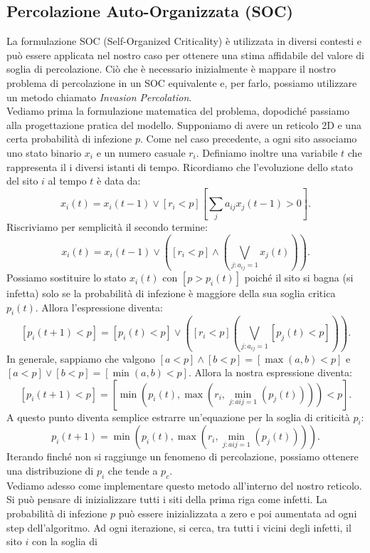 \documentclass{article}
\begin{document}
    \subsection{Percolazione Auto-Organizzata (SOC)}
    La formulazione SOC (Self-Organized Criticality) è utilizzata in diversi contesti e può essere applicata nel nostro
    caso per ottenere una stima affidabile del valore di soglia di percolazione. Ciò che è necessario inizialmente è
    mappare il nostro problema di percolazione in un SOC equivalente e, per farlo, possiamo utilizzare un metodo chiamato
    \textit{Invasion Percolation}.\\
    Vediamo prima la formulazione matematica del problema, dopodiché passiamo alla progettazione pratica del modello.
    Supponiamo di avere un reticolo 2D e una certa probabilità di infezione $p$. Come nel caso precedente, a ogni sito
    associamo uno stato binario $x_i$ e un numero casuale $r_i$. Definiamo inoltre una variabile $t$ che rappresenta il
    i diversi istanti di tempo. Ricordiamo che l'evoluzione dello stato del sito $i$ al tempo $t$ è data da:
    \[x_i(t)=x_i(t-1)\lor[r_i < p]\left[\sum_{j} a_{ij}x_j(t-1)>0 \right].\]
    Riscriviamo per semplicità il secondo termine:
    \[x_i(t)=x_i(t-1)\lor\left([r_i < p]\land \left(\bigvee\limits_{j:a_{ij}=1} x_j(t)\right)\right).\]
    Possiamo sostituire lo stato $x_i(t)$ con $[p>p_i(t)]$ poiché il sito si bagna (si infetta) solo se la probabilità
    di infezione è maggiore della sua soglia critica $p_i(t)$. Allora l'espressione diventa:
    \[[p_i(t+1) < p]=[p_i(t)<p] \lor \left( [r_i<p]\left( \bigvee\limits_{j:a_{ij}=1}[p_j(t)<p] \right) \right).\]
    In generale, sappiamo che valgono $[a<p]\land[b<p]=[\max(a,b)<p]$ e $[a<p]\lor[b<p]=[\min(a,b)<p]$. Allora la nostra
    espressione diventa:
    \[[p_i(t+1)<p]=\left[\min\left( p_i(t), \max\left( r_i, \min_{j:a{ij}=1}\left( p_j(t)\right) \right) \right)<p\right].\]
    A questo punto diventa semplice estrarre un'equazione per la soglia di criticità $p_i$:
    \[p_i(t+1)=\min\left( p_i(t), \max\left( r_i, \min_{j:a{ij}=1}\left( p_j(t)\right) \right) \right).\]
    Iterando finché non si raggiunge un fenomeno di percolazione, possiamo ottenere una distribuzione di $p_i$ che tende a $p_c$.\\
    Vediamo adesso come implementare questo metodo all'interno del nostro reticolo. Si può pensare di inizializzare tutti
    i siti della prima riga come infetti. La probabilità di infezione $p$ può essere inizializzata a zero e poi aumentata
    ad ogni step dell'algoritmo. Ad ogni iterazione, si cerca, tra tutti i vicini degli infetti, il sito $i$ con la soglia di
\end{document}
